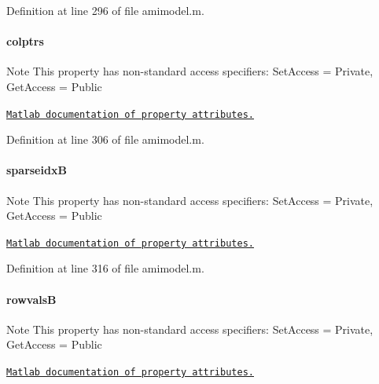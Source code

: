Definition at line 296 of file amimodel.\+m.

\hypertarget{classamimodel_a887e8a11654afa197d040d8bb10cbb38}{}
\paragraph[{colptrs}]{\setlength{\rightskip}{0pt plus 5cm}colptrs}\label{classamimodel_a887e8a11654afa197d040d8bb10cbb38}
\begin{DoxyNote}{Note}
This property has non-\/standard access specifiers\+: {\ttfamily Set\+Access = Private, Get\+Access = Public} 

\href{http://www.mathworks.com/help/matlab/matlab_oop/property-attributes.html}{\tt Matlab documentation of property attributes.} 
\end{DoxyNote}


Definition at line 306 of file amimodel.\+m.

\hypertarget{classamimodel_adcfae93a688a66f1954d0832f51e4cc0}{}
\paragraph[{sparseidx\+B}]{\setlength{\rightskip}{0pt plus 5cm}sparseidx\+B}\label{classamimodel_adcfae93a688a66f1954d0832f51e4cc0}
\begin{DoxyNote}{Note}
This property has non-\/standard access specifiers\+: {\ttfamily Set\+Access = Private, Get\+Access = Public} 

\href{http://www.mathworks.com/help/matlab/matlab_oop/property-attributes.html}{\tt Matlab documentation of property attributes.} 
\end{DoxyNote}


Definition at line 316 of file amimodel.\+m.

\hypertarget{classamimodel_a1ba81ee0e28fe7c7576911973c82be70}{}
\paragraph[{rowvals\+B}]{\setlength{\rightskip}{0pt plus 5cm}rowvals\+B}\label{classamimodel_a1ba81ee0e28fe7c7576911973c82be70}
\begin{DoxyNote}{Note}
This property has non-\/standard access specifiers\+: {\ttfamily Set\+Access = Private, Get\+Access = Public} 

\href{http://www.mathworks.com/help/matlab/matlab_oop/property-attributes.html}{\tt Matlab documentation of property attributes.} 
\end{DoxyNote}


